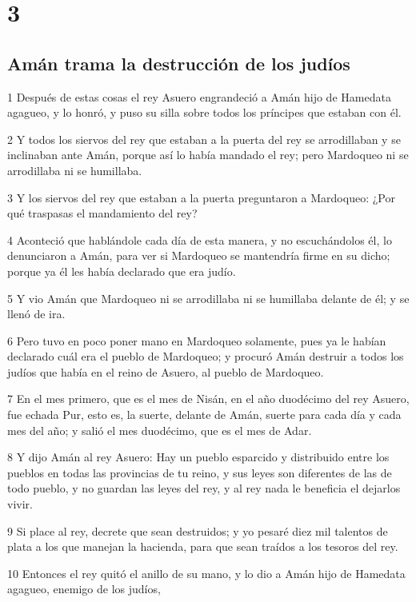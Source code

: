 \chapter{3}

\section*{Amán trama la destrucción de los judíos}

\par 1 Después de estas cosas el rey Asuero engrandeció a Amán hijo de Hamedata agagueo, y lo honró, y puso su silla sobre todos los príncipes que estaban con él.
\par 2 Y todos los siervos del rey que estaban a la puerta del rey se arrodillaban y se inclinaban ante Amán, porque así lo había mandado el rey; pero Mardoqueo ni se arrodillaba ni se humillaba.
\par 3 Y los siervos del rey que estaban a la puerta preguntaron a Mardoqueo: ¿Por qué traspasas el mandamiento del rey?
\par 4 Aconteció que hablándole cada día de esta manera, y no escuchándolos él, lo denunciaron a Amán, para ver si Mardoqueo se mantendría firme en su dicho; porque ya él les había declarado que era judío.
\par 5 Y vio Amán que Mardoqueo ni se arrodillaba ni se humillaba delante de él; y se llenó de ira.
\par 6 Pero tuvo en poco poner mano en Mardoqueo solamente, pues ya le habían declarado cuál era el pueblo de Mardoqueo; y procuró Amán destruir a todos los judíos que había en el reino de Asuero, al pueblo de Mardoqueo.
\par 7 En el mes primero, que es el mes de Nisán, en el año duodécimo del rey Asuero, fue echada Pur, esto es, la suerte, delante de Amán, suerte para cada día y cada mes del año; y salió el mes duodécimo, que es el mes de Adar.
\par 8 Y dijo Amán al rey Asuero: Hay un pueblo esparcido y distribuido entre los pueblos en todas las provincias de tu reino, y sus leyes son diferentes de las de todo pueblo, y no guardan las leyes del rey, y al rey nada le beneficia el dejarlos vivir.
\par 9 Si place al rey, decrete que sean destruidos; y yo pesaré diez mil talentos de plata   a los que manejan la hacienda, para que sean traídos a los tesoros del rey.
\par 10 Entonces el rey quitó el anillo de su mano, y lo dio a Amán hijo de Hamedata agagueo, enemigo de los judíos,

